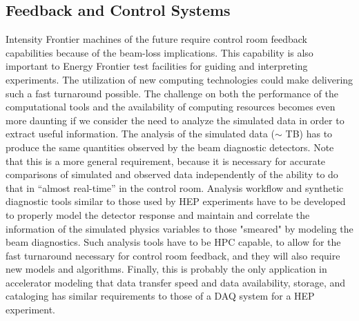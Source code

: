 \subsection{Feedback and Control Systems}
Intensity Frontier machines of the future require control room
feedback capabilities because of the beam-loss implications.  This 
capability is also important to Energy Frontier test
facilities for guiding and interpreting experiments.   The utilization of new computing technologies could make 
delivering  such a fast turnaround possible. The challenge on both the
performance of the computational tools and the availability of
computing resources becomes even  more daunting if we consider
the need to analyze the simulated data in order to extract useful
information.  The analysis of the simulated data ($\sim$ TB) has
to produce the same quantities observed by the beam diagnostic
detectors.  Note that this is a more general requirement, because
it is necessary for accurate comparisons of simulated and
observed data independently of the ability to do that in ``almost
real-time'' in the control room.  Analysis workflow
and synthetic diagnostic tools similar to those used by HEP
experiments have to be developed to properly model the detector
response and maintain and correlate the information of the
simulated physics variables to those "smeared" by modeling the
beam diagnostics.  Such analysis tools have to be HPC capable, to
allow for the fast turnaround necessary for control room
feedback, and they will also require new models
and algorithms.  Finally, this is probably the only application
in accelerator modeling that data transfer speed and data
availability, storage, and cataloging has similar requirements to
those of a  DAQ system for a HEP experiment.


